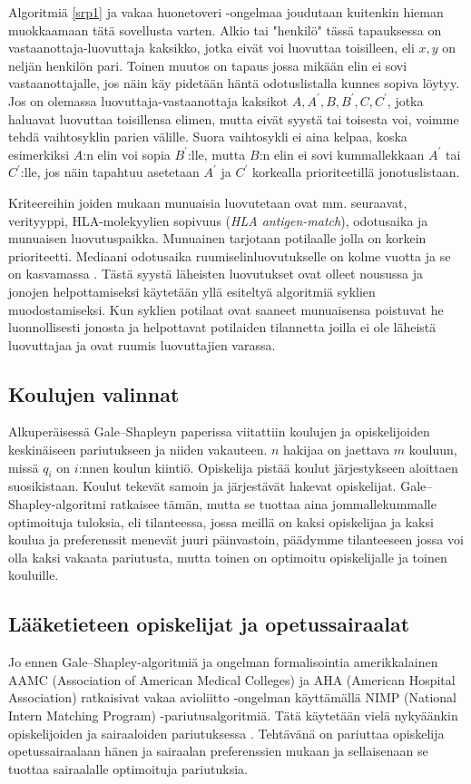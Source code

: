 \documentclass[finnish]{tktltiki2}
\theoremstyle{definition}
\theoremstyle{remark}
\begin{document}
Algoritmiä \ref{srp1} ja vakaa huonetoveri -ongelmaa joudutaan kuitenkin hieman muokkaamaan tätä sovellusta varten. Alkio tai "henkilö" tässä tapauksessa on vastaanottaja-luovuttaja kaksikko, jotka eivät voi luovuttaa toisilleen, eli ${x, y}$ on neljän henkilön pari. Toinen muutos on tapaus jossa mikään elin ei sovi vastaanottajalle, jos näin käy pidetään häntä odotuslistalla kunnes sopiva löytyy. Jos on olemassa luovuttaja-vastaanottaja kaksikot ${A, A^{'}}, {B, B^{'}}, {C, C^{'}}$, jotka haluavat luovuttaa toisillensa elimen, mutta eivät syystä tai toisesta voi, voimme tehdä vaihtosyklin parien välille. Suora vaihtosykli ei aina kelpaa, koska esimerkiksi $A$:n elin voi sopia $B^{'}$:lle, mutta $B$:n elin ei sovi kummallekkaan $A^{'}$ tai $C^{'}$:lle, jos näin tapahtuu asetetaan $A^{'}$ ja $C^{'}$ korkealla prioriteetillä jonotuslistaan.

Kriteereihin joiden mukaan munuaisia luovutetaan ovat mm. seuraavat, verityyppi, HLA-molekyylien sopivuus (\emph{HLA antigen-match}), odotusaika ja munuaisen luovutuspaikka. Munuainen tarjotaan potilaalle jolla on korkein prioriteetti. Mediaani odotusaika ruumiselinluovutukselle on kolme vuotta ja se on kasvamassa \cite[s. 7]{NBERw10002}. Tästä syystä läheisten luovutukset ovat olleet nousussa ja jonojen helpottamiseksi käytetään yllä esiteltyä algoritmiä syklien muodostamiseksi. Kun syklien potilaat ovat saaneet munuaisensa poistuvat he luonnollisesti jonosta ja helpottavat potilaiden tilannetta joilla ei ole läheistä luovuttajaa ja ovat ruumis luovuttajien varassa.


\subsection{Koulujen valinnat}
Alkuperäisessä Gale--Shapleyn paperissa \cite{gale62a} viitattiin koulujen ja opiskelijoiden keskinäiseen pariutukseen ja niiden vakauteen. $n$ hakijaa on jaettava $m$ kouluun, missä $q_{i}$ on $i$:nnen koulun kiintiö. Opiskelija pistää koulut järjestykseen aloittaen suosikistaan. Koulut tekevät samoin ja järjestävät hakevat opiskelijat. Gale--Shapley-algoritmi ratkaisee tämän, mutta se tuottaa aina jommallekummalle optimoituja tuloksia, eli tilanteessa, jossa meillä on kaksi opiskelijaa ja kaksi koulua ja preferenssit menevät juuri päinvastoin, päädymme tilanteeseen jossa voi olla kaksi vakaata pariutusta, mutta toinen on optimoitu opiskelijalle ja toinen kouluille.

\subsection{Lääketieteen opiskelijat ja opetussairaalat}
Jo ennen Gale--Shapley-algoritmiä ja ongelman formalisointia amerikkalainen AAMC (Association of American Medical Colleges) ja AHA (American Hospital Association) ratkaisivat vakaa avioliitto -ongelman käyttämällä NIMP (National Intern Matching Program) -pariutusalgoritmiä. Tätä käytetään vielä nykyäänkin opiskelijoiden ja sairaaloiden pariutuksessa \cite{roth84}. Tehtävänä on pariuttaa opiskelija opetussairaalaan hänen ja sairaalan preferenssien mukaan ja sellaisenaan se tuottaa sairaalalle optimoituja pariutuksia.
\end{document}
